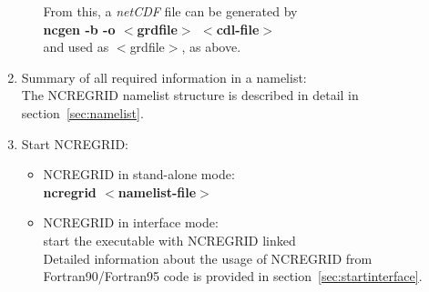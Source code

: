 \documentclass[12pt, a4paper]{article}
\begin{document}
\begin{enumerate}
\begin{itemize}
            From this, a {\it netCDF} file can be generated by\\
            {\bf ncgen -b -o $<$grdfile$>$ $<$cdl-file$>$}\\
            and used as $<$grdfile$>$, as above.
      \end{itemize}
\item Summary of all required information in a namelist:\\
      The NCREGRID namelist structure is described in detail in
      section~\ref{sec:namelist}.
\item Start NCREGRID:\\
      \begin{itemize}
      \item NCREGRID in stand-alone mode:\\
            {\bf ncregrid $<$namelist-file$>$}
      \item NCREGRID in interface mode:\\
            start the executable with NCREGRID linked\\
            Detailed information about the usage of NCREGRID from
            Fortran90/Fortran95 code is provided in
            section~\ref{sec:startinterface}.
      \end{itemize}
\end{enumerate}

\end{document}
